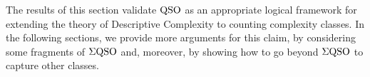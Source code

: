 The results of this section validate ${\rm QSO}$ as an appropriate logical framework for extending the theory of Descriptive Complexity to counting complexity classes. In the following sections, we provide more arguments for this claim, by considering some fragments of $\Sigma{\rm QSO}$ and, moreover, by showing how to go beyond $\Sigma{\rm QSO}$ to capture other 
classes.

